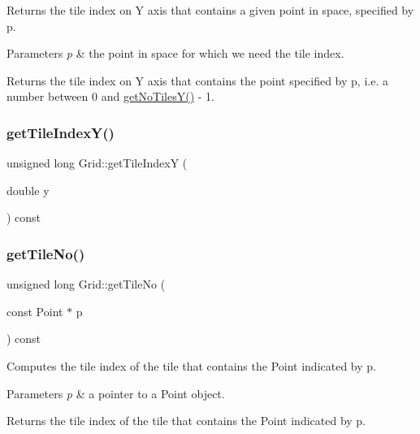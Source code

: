 Returns the tile index on Y axis that contains a given point in space, specified by p. 
\begin{DoxyParams}{Parameters}
{\em p} & the point in space for which we need the tile index. \\
\hline
\end{DoxyParams}
\begin{DoxyReturn}{Returns}
the tile index on Y axis that contains the point specified by p, i.\+e. a number between 0 and \mbox{\hyperlink{class_grid_a783a3153d03154cfd33e6a418bb8d390}{get\+No\+Tiles\+Y()}} -\/ 1. 
\end{DoxyReturn}
\mbox{\label{class_grid_ad745f856bb2b27382118ac03fafc06b4}} 
\subsubsection{\texorpdfstring{getTileIndexY()}{getTileIndexY()}\hspace{0.1cm}{\footnotesize\ttfamily [2/2]}}
{\footnotesize\ttfamily unsigned long Grid\+::get\+Tile\+IndexY (\begin{DoxyParamCaption}\item[{double}]{y }\end{DoxyParamCaption}) const}

\mbox{\label{class_grid_a93e42713b7af1f188ce90f92a5e202ab}} 
\subsubsection{\texorpdfstring{getTileNo()}{getTileNo()}\hspace{0.1cm}{\footnotesize\ttfamily [1/2]}}
{\footnotesize\ttfamily unsigned long Grid\+::get\+Tile\+No (\begin{DoxyParamCaption}\item[{const Point $\ast$}]{p }\end{DoxyParamCaption}) const}

Computes the tile index of the tile that contains the Point indicated by p. 
\begin{DoxyParams}{Parameters}
{\em p} & a pointer to a Point object. \\
\hline
\end{DoxyParams}
\begin{DoxyReturn}{Returns}
the tile index of the tile that contains the Point indicated by p. 
\end{DoxyReturn}
\mbox{\label{class_grid_a02dee9ad3ee575623916c0041f72eb5e}} 
